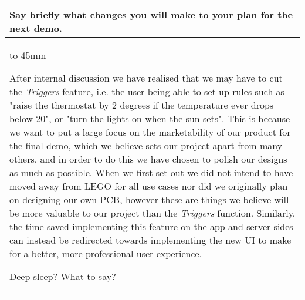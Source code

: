 \documentclass[a4paper]{article}
\newcommand{\colWidth}{141mm}
\begin{document}
\begin{center}
\begin{tabular}{|p{\colWidth}|}
	\hline
	\cellcolor{blue!25}\large
	\textbf{Say briefly what changes you will make to your plan for the next demo.}
	\\ \hline
	\vtop to 45mm{
		After internal discussion we have realised that we may have to cut the \textit{Triggers} feature,
		i.e. the user being able to set up rules such as "raise the thermostat by 2 degrees if the temperature ever drops below 20",
		or "turn the lights on when the sun sets".
		This is because we want to put a large focus on the marketability of our product for the final demo, which we believe sets
		our project apart from many others, and in order to do this we have chosen to polish our designs as much as possible.
		When we first set out we did not intend to have moved away from LEGO for all use cases nor did we originally plan on designing our own PCB, however these are things we believe will be more valuable to our project than the \textit{Triggers} function.
		Similarly, the time saved implementing this feature on the app and server sides can instead be redirected towards implementing the new UI to make for a better, more professional user experience.
		
		\vspace{3mm}
		
		{\color{red} Deep sleep? What to say?}
		
  	}
  \\
  \hline
\end{tabular}

\end{center}
  
\end{document}
